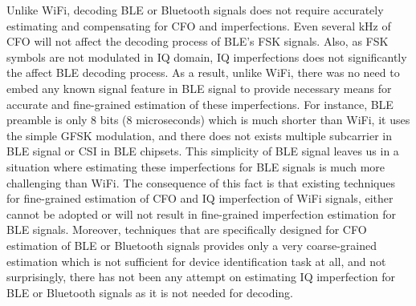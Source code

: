 Unlike WiFi, decoding BLE or Bluetooth signals does not require accurately
estimating and compensating for CFO and \iq imperfections.
%
Even several kHz of CFO will not affect the decoding process of BLE's FSK
signals. Also, as FSK symbols are not modulated in IQ domain, IQ imperfections
does not significantly the affect BLE decoding process.
%
As a result, unlike WiFi, there was no need to embed any known signal feature
in BLE signal to provide necessary means for accurate and fine-grained
estimation of these imperfections.
%
For instance, BLE preamble is only 8 bits (8 microseconds) which is much
shorter than WiFi, it uses the simple GFSK modulation, and there does not
exists multiple subcarrier in BLE signal or CSI in BLE chipsets. This
simplicity of BLE signal leaves us in a situation where estimating these
imperfections for BLE signals is much more challenging than WiFi.
The consequence of this fact is that existing techniques for fine-grained
estimation of CFO and IQ imperfection of WiFi signals, either cannot be
adopted or will not result in fine-grained imperfection estimation for BLE
signals.  Moreover, techniques that are specifically designed for CFO
estimation of BLE or Bluetooth signals provides only a very coarse-grained
estimation which is not sufficient for device identification task at all, and
not surprisingly, there has not been any attempt on estimating IQ imperfection
for BLE or Bluetooth signals as it is not needed for decoding.
\fi


%

%
%

%

%
%
%



